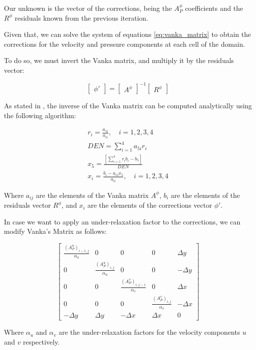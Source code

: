 Our unknown is the vector of the corrections, being the $A_P^\phi$ coefficients and the $R^\phi$ residuals known from the previous iteration.

Given that, we can solve the system of equations \ref{eq:vanka_matrix} to obtain the corrections for the velocity and pressure components at each cell of the domain.

To do so, we must invert the Vanka matrix, and multiply it by the residuals vector:

\begin{equation}
    \begin{bmatrix}
        \phi'
    \end{bmatrix}
    =
    \begin{bmatrix}
        A^\phi
    \end{bmatrix}^{-1}
    \begin{bmatrix}
        R^\phi
    \end{bmatrix}
\end{equation}

As stated in \cite{VANKA1986138}, the inverse of the Vanka matrix can be computed analytically using the following algorithm:

\begin{gather}
    r_i = \frac{a_{5i}}{a_{ii}}, \quad i = 1, 2, 3, 4 \\
    DEN = \sum_{i=1}^{4} a_{5i} r_i \\
    x_5 = \frac{\left[\sum_{i=1}^{4} r_i b_i - b_5\right]}{DEN} \\
    x_i = \frac{b_i - a_{i5} x_5}{a_{ii}}, \quad i = 1, 2, 3, 4
\end{gather}

Where $a_{ij}$ are the elements of the Vanka matrix $A^\phi$, $b_i$ are the elements of the residuals vector $R^\phi$, and $x_i$ are the elements of the corrections vector $\phi'$.

In case we want to apply an under-relaxation factor to the corrections, we can modify Vanka's Matrix as follows:

\begin{equation}
    \begin{bmatrix}
        \frac{(A_P^u)_{i-1,j}}{\alpha_u} & 0                              & 0                                & 0                              & \Delta y  \\
        0                                & \frac{(A_P^u)_{i,j}}{\alpha_u} & 0                                & 0                              & -\Delta y \\
        0                                & 0                              & \frac{(A_P^v)_{i,j-1}}{\alpha_v} & 0                              & \Delta x  \\
        0                                & 0                              & 0                                & \frac{(A_P^v)_{i,j}}{\alpha_v} & -\Delta x \\
        -\Delta y                        & \Delta y                       & -\Delta x                        & \Delta x                       & 0
    \end{bmatrix}
\end{equation}

Where $\alpha_u$ and $\alpha_v$ are the under-relaxation factors for the velocity components $u$ and $v$ respectively.
